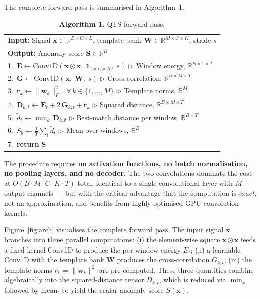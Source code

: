 \documentclass{iopjournal}
\begin{document}
The complete forward pass is summarised in Algorithm~1.

\begin{table}[h]
\centering
\caption{\textbf{Algorithm 1.} QTS forward pass.}
\label{alg:qts}
\begin{tabular}{p{}}
\hline
\textbf{Input:} Signal $\mathbf{x} \in \mathbb{R}^{B \times C \times L}$, template bank $\mathbf{W} \in \mathbb{R}^{M \times C \times K}$, stride $s$ \\
\textbf{Output:} Anomaly score $\mathbf{S} \in \mathbb{R}^{B}$ \\
\hline
1.\ $\mathbf{E} \leftarrow \mathrm{Conv1D}(\mathbf{x} \odot \mathbf{x}, \; \mathbf{1}_{1 \times C \times K}, \; s)$ \quad $\triangleright$ Window energy, $\mathbb{R}^{B \times 1 \times T}$ \\
2.\ $\mathbf{G} \leftarrow \mathrm{Conv1D}(\mathbf{x}, \; \mathbf{W}, \; s)$ \quad $\triangleright$ Cross-correlation, $\mathbb{R}^{B \times M \times T}$ \\
3.\ $\mathbf{r}_k \leftarrow \|\mathbf{w}_k\|_F^2, \; \forall \, k \in \{1, \ldots, M\}$ \quad $\triangleright$ Template norms, $\mathbb{R}^{M}$ \\
4.\ $\mathbf{D}_{k,t} \leftarrow \mathbf{E}_t + 2 \, \mathbf{G}_{k,t} + \mathbf{r}_k$ \quad $\triangleright$ Squared distance, $\mathbb{R}^{B \times M \times T}$ \\
5.\ $\tilde{d}_t \leftarrow \min_{k} \, \mathbf{D}_{k,t}$ \quad $\triangleright$ Best-match distance per window, $\mathbb{R}^{B \times T}$ \\
6.\ $S_b \leftarrow \frac{1}{T} \sum_{t} \tilde{d}_t$ \quad $\triangleright$ Mean over windows, $\mathbb{R}^{B}$ \\
7.\ \textbf{return} $\mathbf{S}$ \\
\hline
\end{tabular}
\end{table}

The procedure requires \textbf{no activation functions, no batch normalisation, no pooling layers, and no decoder}. The two convolutions dominate the cost at $O(B \cdot M \cdot C \cdot K \cdot T)$ total, identical to a single convolutional layer with $M$ output channels --- but with the critical advantage that the computation is \emph{exact}, not an approximation, and benefits from highly optimised GPU convolution kernels.

Figure~\ref{fig:arch} visualises the complete forward pass. The input signal $\mathbf{x}$ branches into three parallel computations: (i) the element-wise square $\mathbf{x} \odot \mathbf{x}$ feeds a fixed-kernel Conv1D to produce the per-window energy $E_t$; (ii) a learnable Conv1D with the template bank $\mathbf{W}$ produces the cross-correlation $G_{k,t}$; (iii) the template norms $r_k = \|\mathbf{w}_k\|^2$ are pre-computed. These three quantities combine algebraically into the squared-distance tensor $D_{k,t}$, which is reduced via $\min_k$ followed by $\mathrm{mean}_t$ to yield the scalar anomaly score $S(\mathbf{x})$.
\end{document}
